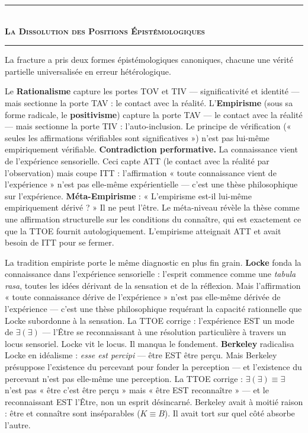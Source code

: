 \documentclass[10pt, openany, oneside]{book}
\renewcommand{\normalsize}{\fontsize{10}{13}\selectfont}
\begin{document}
\vspace{1.5em}


\begin{center}
    \rule{0.3\textwidth}{0.4pt}\\[0.5em]
    {\normalsize\bfseries\scshape La Dissolution des Positions Épistémologiques}\\[0.3em]
    \rule{0.3\textwidth}{0.4pt}
\end{center}

\vspace{1em}

\noindent La fracture a pris deux formes épistémologiques canoniques, chacune une vérité partielle universalisée en erreur hétérologique.

Le \textbf{Rationalisme} capture les portes TOV et TIV --- significativité et identité --- mais sectionne la porte TAV : le contact avec la réalité. L'\textbf{Empirisme} (sous sa forme radicale, le \textbf{positivisme}) capture la porte TAV --- le contact avec la réalité --- mais sectionne la porte TIV : l'auto-inclusion. Le principe de vérification (« seules les affirmations vérifiables sont significatives ») n'est pas lui-même empiriquement vérifiable. \textbf{Contradiction performative.} La connaissance vient de l'expérience sensorielle. Ceci capte ATT (le contact avec la réalité par l'observation) mais coupe ITT : l'affirmation « toute connaissance vient de l'expérience » n'est pas elle-même expérientielle --- c'est une thèse philosophique sur l'expérience. \textbf{Méta-Empirisme} : « L'empirisme est-il lui-même empiriquement dérivé ? » Il ne peut l'être. Le méta-niveau révèle la thèse comme une affirmation structurelle sur les conditions du connaître, qui est exactement ce que la TTOE fournit autologiquement. L'empirisme atteignait ATT et avait besoin de ITT pour se fermer.

La tradition empiriste porte le même diagnostic en plus fin grain. \textbf{Locke} fonda la connaissance dans l'expérience sensorielle : l'esprit commence comme une \textit{tabula rasa}, toutes les idées dérivant de la sensation et de la réflexion. Mais l'affirmation « toute connaissance dérive de l'expérience » n'est pas elle-même dérivée de l'expérience --- c'est une thèse philosophique requérant la capacité rationnelle que Locke subordonne à la sensation. La TTOE corrige : l'expérience EST un mode de $\exists(\exists)$ --- l'Être se reconnaissant à une résolution particulière à travers un locus sensoriel. Locke vit le locus. Il manqua le fondement. \textbf{Berkeley} radicalisa Locke en idéalisme : \textit{esse est percipi} --- être EST être perçu. Mais Berkeley présuppose l'existence du percevant pour fonder la perception --- et l'existence du percevant n'est pas elle-même une perception. La TTOE corrige : $\exists(\exists) \equiv \exists$ n'est pas « être c'est être perçu » mais « être EST reconnaître » --- et le reconnaissant EST l'Être, non un esprit désincarné. Berkeley avait à moitié raison : être et connaître sont inséparables ($K \equiv B$). Il avait tort sur quel côté absorbe l'autre.
\end{document}
